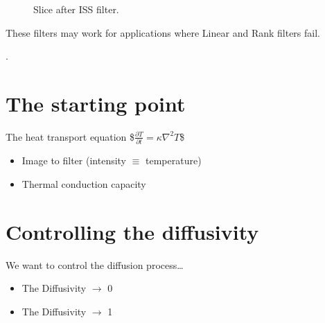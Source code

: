 \documentclass[letterpaper,10pt,english]{sphinxmanual}
\begin{document}
\begin{figure}[htbp]
\centering
\capstart

\noindent{}
\caption{Slice after ISS filter.}\label{\detokenize{02-ImageEnhancement:id26}}\end{figure}



\sphinxAtStartPar
These filters may work for applications where Linear and Rank filters fail.

\sphinxAtStartPar
{}.


\section{The starting point}
\label{\detokenize{02-ImageEnhancement:the-starting-point}}
\sphinxAtStartPar
The heat transport equation
\$\(\frac{\partial T}{\partial t}=\kappa \nabla^2 T\)\$
\begin{itemize}
\item {} 
\sphinxAtStartPar
{} Image to filter (intensity \(\equiv\) temperature)

\item {} 
\sphinxAtStartPar
\sphinxstylestrong{\(\kappa\)} Thermal conduction capacity

\end{itemize}






\section{Controlling the diffusivity}
\label{\detokenize{02-ImageEnhancement:controlling-the-diffusivity}}
\begin{sphinxVerbatim}[commandchars=\\\{\}]
  
     
\end{sphinxVerbatim}

\sphinxAtStartPar
We want to control the diffusion process…
\begin{itemize}
\item {} 
\sphinxAtStartPar
{} The Diffusivity \(\rightarrow\) 0

\item {} 
\sphinxAtStartPar
{} The Diffusivity \(\rightarrow\) 1

\end{itemize}
\end{document}
